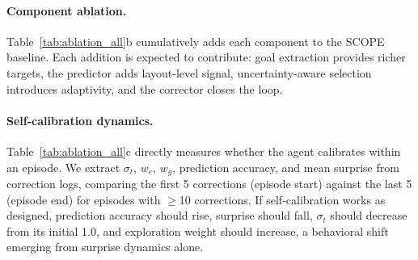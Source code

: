\documentclass[10pt,twocolumn,letterpaper]{article}
\begin{document}
\paragraph{Component ablation.} Table~\ref{tab:ablation_all}b cumulatively adds each component to the SCOPE baseline. Each addition is expected to contribute: goal extraction provides richer targets, the predictor adds layout-level signal, uncertainty-aware selection introduces adaptivity, and the corrector closes the loop.

\paragraph{Self-calibration dynamics.} Table~\ref{tab:ablation_all}c directly measures whether the agent calibrates within an episode. We extract $\sigma_t$, $w_e$, $w_g$, prediction accuracy, and mean surprise from correction logs, comparing the first 5 corrections (episode start) against the last 5 (episode end) for episodes with $\ge$10 corrections. If self-calibration works as designed, prediction accuracy should rise, surprise should fall, $\sigma_t$ should decrease from its initial 1.0, and exploration weight should increase, a behavioral shift emerging from surprise dynamics alone.
\end{document}
